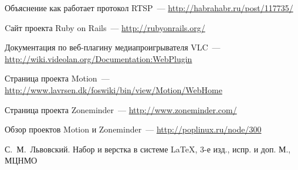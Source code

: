\begin{thebibliography}{2013}
  Объяснение как работает протокол RTSP~---
  \url{http://habrahabr.ru/post/117735/}

  Cайт проекта Ruby on Rails~---
  \url{http://rubyonrails.org/}

  Документация по веб-плагину медиапроигрывателя VLC~---
  \url{http://wiki.videolan.org/Documentation:WebPlugin}

  Страница проекта Motion~---
  \url{http://www.lavrsen.dk/foswiki/bin/view/Motion/WebHome}

  Страница проекта Zoneminder~---
  \url{http://www.zoneminder.com/}

  Обзор проектов Motion и Zoneminder~---
  \url{http://poplinux.ru/node/300}

\by С.~М.~Львовский.
\book Набор и верстка в системе \LaTeX, 3-е изд., испр. и доп.
\publaddr М., МЦНМО

\end{thebibliography}

\endinput
